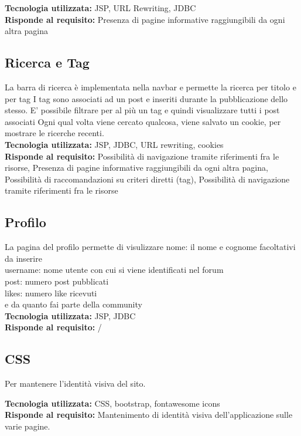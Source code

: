\documentclass{article} %
\begin{document}
    \textbf{Tecnologia utilizzata:} JSP, URL Rewriting, JDBC \\
    \textbf{Risponde al requisito:} Presenza di pagine informative raggiungibili da ogni altra pagina 

    \subsection{Ricerca e Tag}

    La barra di ricerca è implementata nella navbar e permette la ricerca per titolo e per tag 
    I tag sono associati ad un post e inseriti durante la pubblicazione dello stesso. E' possibile filtrare per al più un tag e quindi visualizzare tutti i post associati
    Ogni qual volta viene cercato qualcosa, viene salvato un cookie, per mostrare le ricerche recenti. \\

    \textbf{Tecnologia utilizzata:} JSP, JDBC, URL rewriting, cookies \\
    \textbf{Risponde al requisito:} Possibilità di navigazione tramite riferimenti fra le risorse, Presenza di pagine informative raggiungibili da ogni altra pagina, Possibilità di raccomandazioni su criteri diretti (tag), Possibilità di navigazione tramite riferimenti fra le risorse

    \subsection{Profilo}
    La pagina del profilo permette di visulizzare 
    nome: il nome e cognome facoltativi da inserire \\
    username: nome utente con cui si viene identificati nel forum\\
    post: numero post pubblicati\\
    likes: numero like ricevuti\\
    e da quanto fai parte della community \\
    \textbf{Tecnologia utilizzata:} JSP, JDBC \\
    \textbf{Risponde al requisito:} /
    
    \subsection{CSS}

    Per mantenere l'identità visiva del sito.

    \textbf{Tecnologia utilizzata:} CSS, bootstrap, fontawesome icons \\
    \textbf{Risponde al requisito:} Mantenimento di identità visiva dell’applicazione sulle varie pagine. 
\end{document}
